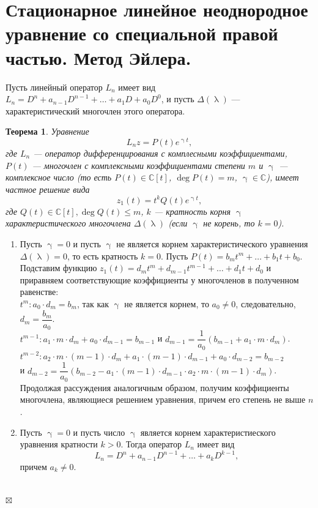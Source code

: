 \documentclass[a4paper, 12pt]{report}
\newenvironment{Proof} %
{\par\noindent{$\blacklozenge$}} %
{\hfill$\scriptstyle\boxtimes$}
\newcommand{\Cm}{\mathbb{C}}
\renewcommand{\lambda}{\uplambda}
\newcommand{\Ln}{L_n = D^n + a_{n-1}D^{n-1} + \ldots + a_1D + a_0D^0}
\begin{document}
\section{Стационарное линейное неоднородное уравнение со специальной правой частью. Метод Эйлера.}
Пусть линейный оператор $L_n$ имеет вид $\Ln$, и пусть $\Delta(\lambda)$ --- характеристический многочлен этого оператора.
\newtheorem*{2_5_1}{Теорема}\begin{2_5_1}
	Уравнение $$L_nz = P(t)e^{\upgamma t},$$ где $L_n$ --- оператор дифференцирования с комплесными коэффициентами, $P(t)$ --- многочлен с комплексными коэффициентами степени $m$ и $\upgamma$ --- комплексное число (то есть $P(t)\in\Cm[t]$, $\deg P(t) = m$, $\upgamma \in \Cm$), имеет частное решение вида $$z_1(t) = t^kQ(t)e^{\upgamma t},$$ где $Q(t) \in \Cm[t], \deg Q(t) \leqslant m$, $k$ --- кратность корня $\upgamma$ характеристического многочлена $\Delta(\lambda)$ (если $\upgamma$ не корень, то $k=0$).
\end{2_5_1}\begin{Proof}
\begin{enumerate}
	\item Пусть $\upgamma = 0$ и пусть $\upgamma$ не является корнем характеристического уравнения $\Delta(\lambda) = 0$, то есть кратность $k = 0$. Пусть $P(t) = b_mt^m + \ldots + b_1t + b_0$. Подставим функцию $z_1(t) = d_mt^m + d_{m-1}t^{m-1} + \ldots + d_1t + d_0$ и приравняем соответствующие коэффициенты у многочленов в полученном равенстве:\\
	$t^m : a_0\cdot d_m = b_m$, так как $\upgamma$ не является корнем, то $a_0 \ne 0$, следовательно, $d_m = \dfrac{b_m}{a_0}$.\\
	$t^{m-1} : a_1\cdot m\cdot d_m + a_0\cdot  d_{m-1}= b_{m-1}$ и $d_{m-1} = \dfrac{1}{a_0}(b_{m-1} + a_1\cdot m \cdot d_m)$.\\
	$t^{m-2} : a_2\cdot m\cdot (m-1)\cdot d_m + a_1\cdot (m-1) \cdot d_{m-1} + a_0 \cdot d_{m-2} = b_{m-2}$\\ и $d_{m-2} = \dfrac{1}{a_0}(b_{m-2} - a_1\cdot (m-1)\cdot d_{m-1}\cdot a_2\cdot m\cdot (m-1)\cdot d_m)$.\\
	Продолжая рассуждения аналогичным образом, получим коэффициенты многочлена, являющиеся решением уравнения, причем его степень не выше $n$.
	\item Пусть $\upgamma = 0$ и пусть число $\upgamma$ является корнем характеристиеского уравнения кратности $k > 0$. Тогда оператор $L_n$ имеет вид $$L_n = D^n + a_{n-1}D^{n-1} + \ldots + a_k D^{k-1},$$ причем $a_k \ne 0$.\\\\

\end{enumerate}
\end{Proof}
\end{document}

